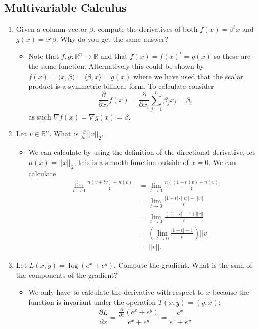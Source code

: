 \documentclass{article}
\begin{document}
\setcounter{subsection}{3}
\subsection{Multivariable Calculus}
\begin{enumerate}
\item Given a column vector $\beta$, compute the derivatives of both $f(x) = \beta^t x$ and $g(x) = x^t \beta$. Why do you get the same answer?
	\begin{itemize}
	\item Note that $f, g : \mathbb{R}^n \rightarrow \mathbb{R}$ and that $f(x) = f(x)^t = g(x)$ so these are the same function. Alternatively this could be shown by $f(x) = \langle x, \beta \rangle = \langle \beta, x \rangle = g(x)$ where we have used that the scalar product is a symmetric bilinear form. To calculate consider
	$$
	\frac{\partial}{\partial x_i} f(x) = \frac{\partial}{\partial x_i} \sum_{j = 1}^n \beta_j x_j = \beta_i
	$$
	as such $\nabla f(x) = \nabla g(x) = \beta$.
	\end{itemize}
\item Let $v \in \mathbb{R}^n$. What is $\frac{\partial}{\partial v} ||v||_2$. 
	\begin{itemize}
	\item We can calculate by using the definition of the directional derivative, let $n(x) = ||x||_2$, this is a smooth function outside of $x = 0$. We can calculate
	$$
	\begin{aligned}
	\lim_{t \rightarrow 0} \frac{n(v + tv) - n(v)}{t} &= \lim_{t \rightarrow 0} \frac{n((1 + t)v) - n(v)}{t} \\
	&= \lim_{t \rightarrow 0} \frac{|1 + t| \cdot ||v|| - ||v||}{t} \\
	&= \lim_{t \rightarrow 0} \frac{(|1 + t| - 1) ||v||}{t} \\
	&= \left(\lim_{t \rightarrow 0} \frac{|1 + t| - 1}{t}\right) ||v|| \\
	&= ||v||.
	\end{aligned}
	$$
	\end{itemize}
\item Let $L(x, y) = \log(e^x + e^y)$. Compute the gradient. What is the sum of the components of the gradient?
	\begin{itemize}
		\item We only have to calculate the derivative with respect to $x$ because the function is invariant under the operation $T(x, y) = (y, x)$:
		$$
		\frac{\partial L}{\partial x} = \frac{\frac{\partial}{\partial x} (e^x + e^y)}{e^x + e^y} = \frac{e^x}{e^x + e^y}
$$
\end{itemize}
\end{enumerate}
\end{document}
